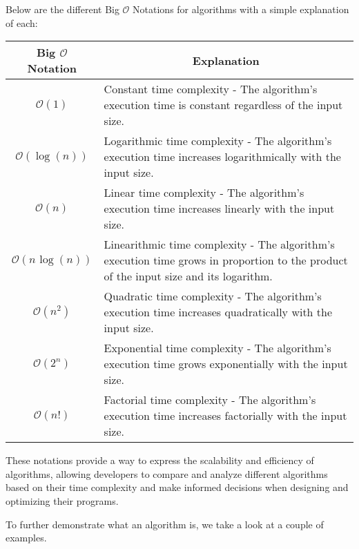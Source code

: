 \begin{solution}
    Below are the different Big $\mathcal{O}$ Notations for algorithms with a simple explanation of each: \\
    \begin{center}
        \begin{tabular}{|c|p{12cm}|}
            \hline \textbf{Big $\mathcal{O}$ Notation} & \multicolumn{1}{|c|}{\textbf{Explanation}} \\ \hline
            $\mathcal{O}(1)$ & Constant time complexity - The algorithm's execution time is constant regardless of the input size. \\ \hline
            $\mathcal{O}(\log{(n)})$ & Logarithmic time complexity - The algorithm's execution time increases logarithmically with the input size. \\ \hline
            $\mathcal{O}(n)$ & Linear time complexity - The algorithm's execution time increases linearly with the input size. \\ \hline
            $\mathcal{O}(n\hspace{1pt}\log{(n)})$ & Linearithmic time complexity - The algorithm's execution time grows in proportion to the product of the input size and its logarithm. \\ \hline
            $\mathcal{O}(n^{2})$ & Quadratic time complexity - The algorithm's execution time increases quadratically with the input size. \\ \hline
            $\mathcal{O}(2^{n})$ & Exponential time complexity - The algorithm's execution time grows exponentially with the input size. \\ \hline
            $\mathcal{O}(n!)$ & 	Factorial time complexity - The algorithm's execution time increases factorially with the input size. \\ \hline
        \end{tabular}
    \end{center}
    These notations provide a way to express the scalability and efficiency of algorithms, allowing developers to compare and analyze different algorithms based on their time complexity and make informed decisions when designing and optimizing their programs.
\end{solution}

To further demonstrate what an algorithm is, we take a look at a couple of examples.

